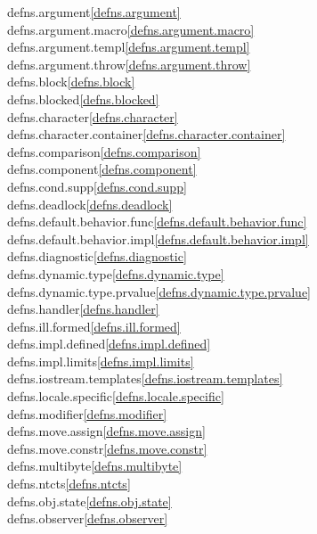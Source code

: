 \begin{multicols}{2}
defns.argument\quad\ref{defns.argument}\\
defns.argument.macro\quad\ref{defns.argument.macro}\\
defns.argument.templ\quad\ref{defns.argument.templ}\\
defns.argument.throw\quad\ref{defns.argument.throw}\\
defns.block\quad\ref{defns.block}\\
defns.blocked\quad\ref{defns.blocked}\\
defns.character\quad\ref{defns.character}\\
defns.character.container\quad\ref{defns.character.container}\\
defns.comparison\quad\ref{defns.comparison}\\
defns.component\quad\ref{defns.component}\\
defns.cond.supp\quad\ref{defns.cond.supp}\\
defns.deadlock\quad\ref{defns.deadlock}\\
defns.default.behavior.func\quad\ref{defns.default.behavior.func}\\
defns.default.behavior.impl\quad\ref{defns.default.behavior.impl}\\
defns.diagnostic\quad\ref{defns.diagnostic}\\
defns.dynamic.type\quad\ref{defns.dynamic.type}\\
defns.dynamic.type.prvalue\quad\ref{defns.dynamic.type.prvalue}\\
defns.handler\quad\ref{defns.handler}\\
defns.ill.formed\quad\ref{defns.ill.formed}\\
defns.impl.defined\quad\ref{defns.impl.defined}\\
defns.impl.limits\quad\ref{defns.impl.limits}\\
defns.iostream.templates\quad\ref{defns.iostream.templates}\\
defns.locale.specific\quad\ref{defns.locale.specific}\\
defns.modifier\quad\ref{defns.modifier}\\
defns.move.assign\quad\ref{defns.move.assign}\\
defns.move.constr\quad\ref{defns.move.constr}\\
defns.multibyte\quad\ref{defns.multibyte}\\
defns.ntcts\quad\ref{defns.ntcts}\\
defns.obj.state\quad\ref{defns.obj.state}\\
defns.observer\quad\ref{defns.observer}\\

\end{multicols}
